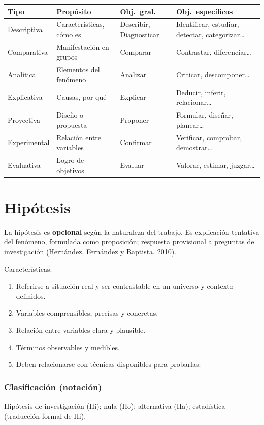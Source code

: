 \documentclass[a4paper,11pt]{book}
\begin{document}
\begin{center}
\small
\begin{tabular}{@{}p{2.2cm}p{3.5cm}p{3cm}p{3.8cm}@{}}
\toprule
\textbf{Tipo} & \textbf{Propósito} & \textbf{Obj.\ gral.} & \textbf{Obj.\ específicos} \\
\midrule
Descriptiva & Características, cómo es & Describir, Diagnosticar & Identificar, estudiar, detectar, categorizar\ldots \\
Comparativa & Manifestación en grupos & Comparar & Contrastar, diferenciar\ldots \\
Analítica & Elementos del fenómeno & Analizar & Criticar, descomponer\ldots \\
Explicativa & Causas, por qué & Explicar & Deducir, inferir, relacionar\ldots \\
Proyectiva & Diseño o propuesta & Proponer & Formular, diseñar, planear\ldots \\
Experimental & Relación entre variables & Confirmar & Verificar, comprobar, demostrar\ldots \\
Evaluativa & Logro de objetivos & Evaluar & Valorar, estimar, juzgar\ldots \\
\bottomrule
\end{tabular}
\end{center}

\chapter{Hipótesis}
\label{cap:hipotesis}

La hipótesis es \textbf{opcional} según la naturaleza del trabajo. Es explicación tentativa del fenómeno, formulada como proposición; respuesta provisional a preguntas de investigación (Hernández, Fernández y Baptista, 2010).

Características:
\begin{enumerate}[leftmargin=*]
  \item Referirse a situación real y ser contrastable en un universo y contexto definidos.
  \item Variables comprensibles, precisas y concretas.
  \item Relación entre variables clara y plausible.
  \item Términos observables y medibles.
  \item Deben relacionarse con técnicas disponibles para probarlas.
\end{enumerate}

\subsection*{Clasificación (notación)}
Hipótesis de investigación (Hi); nula (Ho); alternativa (Ha); estadística (traducción formal de Hi).
\end{document}
